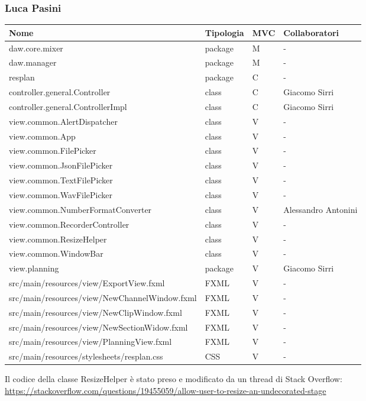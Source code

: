 \documentclass[a4paper,12pt]{report}
\begin{document}
\subsubsection{Luca Pasini}
\begin{center}
\begin{longtable}{| m{22.5em} | m{2cm}| m{1cm} | m{2.7cm} |} 
 \hline
   \textbf{Nome} & \textbf{Tipologia} & \textbf{MVC} & \textbf{Collaboratori} \\ [0.5ex] 
\hline
daw.core.mixer & package & M & - \\
\hline
daw.manager & package & M & - \\
\hline
resplan & package & C & - \\
\hline
controller.general.Controller & class & C & Giacomo Sirri \\
\hline
controller.general.ControllerImpl & class & C & Giacomo Sirri \\
\hline
view.common.AlertDispatcher & class & V & - \\
\hline
view.common.App & class & V & - \\
\hline
view.common.FilePicker & class & V & - \\
\hline
view.common.JsonFilePicker & class & V & - \\
\hline
view.common.TextFilePicker & class & V & - \\
\hline
view.common.WavFilePicker & class & V & - \\
\hline 
view.common.NumberFormatConverter & class & V & Alessandro Antonini \\
\hline
view.common.RecorderController & class & V & - \\
\hline
view.common.ResizeHelper & class & V & - \\
\hline
view.common.WindowBar & class & V & - \\
\hline
view.planning & package & V & Giacomo Sirri \\
\hline
src/main/resources/view/ExportView.fxml & FXML & V & - \\
\hline
src/main/resources/view/NewChannelWindow.fxml & FXML & V & - \\
\hline
src/main/resources/view/NewClipWindow.fxml & FXML & V & - \\
\hline
src/main/resources/view/NewSectionWidow.fxml & FXML & V & - \\
\hline
src/main/resources/view/PlanningView.fxml & FXML & V & - \\
\hline
src/main/resources/stylesheets/resplan.css & CSS & V & - \\
\hline
\end{longtable}
\end{center}
Il codice della classe ResizeHelper è stato preso e modificato da un thread di Stack Overflow:
\href{https://stackoverflow.com/questions/19455059/allow-user-to-resize-an-undecorated-stage}{https://stackoverflow.com/questions/19455059/allow-user-to-resize-an-undecorated-stage}
\end{document}
